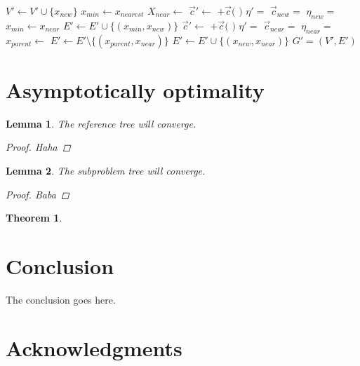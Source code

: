 \documentclass[conference]{IEEEtran}
\newtheorem{thm}{Theorem}
\newtheorem{lem}{Lemma}
\begin{document}
\begin{algorithm}
\begin{algorithmic}[1]
\State $ V' \leftarrow V' \cup \{ x_{new} \} $
\State $ x_{min} \leftarrow x_{nearest} $
\State $ X_{near} \leftarrow $ 
		\State $ \vec{c}' \leftarrow $  $ + \vec{c}( $  $ ) $ 
		\State $ \eta' =  $ 
		\State $ \vec{c}_{new} = $  
		\State $ \eta_{new} = $ 
			\State $ x_{min} \leftarrow x_{near} $
		\EndIf
	\EndIf
\EndFor
\State $ E' \leftarrow E' \cup \{ ( x_{min}, x_{new} ) \} $
		\State $ \vec{c}' \leftarrow $  $ + \vec{c}( $  $ ) $ 
		\State $ \eta' =  $ 
		\State $ \vec{c}_{near} = $  
		\State $ \eta_{near} = $ 
			\State $ x_{parent} \leftarrow $ 
			\State $ E' \leftarrow E' \setminus \{ ( x_{parent}, x_{near} ) \} $
			\State $ E' \leftarrow E' \cup \{ ( x_{new}, x_{near} ) \} $
		\EndIf
	\EndIf
\EndFor
\Return $ G' = (V', E') $ 
\end{algorithmic}
\label{alg:morrtstar:extend:sub}
\caption{ $ \mbox{Extend}_{Sub} (G, x) $}
\end{algorithm} 

\section{Asymptotically optimality}

\begin{lem}
\label{lem:ref_tree:conv}
The reference tree will converge.
\begin{proof}
Haha
\end{proof}
\end{lem}

\begin{lem}
\label{lem:sub_tree:conv}
The subproblem tree will converge.
\begin{proof}
Baba
\end{proof}
\end{lem}

\begin{thm}
\label{thm:morrt:asym_opt}
\end{thm}



\section{Conclusion} 
\label{sec:conclusion}

The conclusion goes here.

\section*{Acknowledgments}




\end{document}
